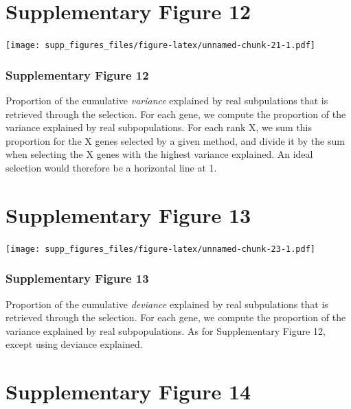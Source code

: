 \documentclass[]{article}
\begin{document}
\newpage

\hypertarget{supplementary-figure-12}{%
\section{Supplementary Figure 12}\label{supplementary-figure-12}}

\texttt{[image: supp\_figures\_files/figure-latex/unnamed-chunk-21-1.pdf]}

\hypertarget{supplementary-figure-12-1}{%
\subsubsection{Supplementary Figure
12}\label{supplementary-figure-12-1}}

Proportion of the cumulative \emph{variance} explained by real
subpulations that is retrieved through the selection. For each gene, we
compute the proportion of the variance explained by real subpopulations.
For each rank X, we sum this proportion for the X genes selected by a
given method, and divide it by the sum when selecting the X genes with
the highest variance explained. An ideal selection would therefore be a
horizontal line at 1.

\newpage

\hypertarget{supplementary-figure-13}{%
\section{Supplementary Figure 13}\label{supplementary-figure-13}}

\texttt{[image: supp\_figures\_files/figure-latex/unnamed-chunk-23-1.pdf]}

\hypertarget{supplementary-figure-13-1}{%
\subsubsection{Supplementary Figure
13}\label{supplementary-figure-13-1}}

Proportion of the cumulative \emph{deviance} explained by real
subpulations that is retrieved through the selection. For each gene, we
compute the proportion of the variance explained by real subpopulations.
As for Supplementary Figure 12, except using deviance explained.

\newpage

\hypertarget{supplementary-figure-14}{%
\section{Supplementary Figure 14}\label{supplementary-figure-14}}
\end{document}
